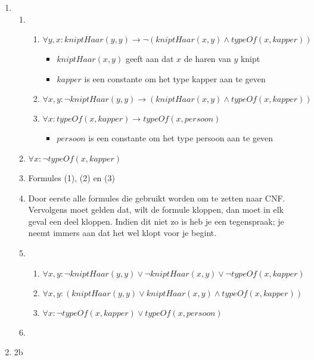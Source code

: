 \documentclass[]{article}
\begin{document}
  \begin{enumerate}[a]
    \item
    \begin{enumerate}[i]
      \item
      \begin{enumerate}[1]
        \item $\forall y, x : kniptHaar(y,y) \longrightarrow \neg (kniptHaar(x,y) \land typeOf(x,kapper)) $
        \begin{itemize}
          \item $kniptHaar(x,y)$ geeft aan dat $x$ de haren van $y$ knipt
          \item $kapper$ is een constante om het type kapper aan te geven
        \end{itemize}
        \item $\forall x,y : \neg kniptHaar(y,y) \longrightarrow (kniptHaar(x,y) \land typeOf(x,kapper)) $
        \item $\forall x: typeOf(x,kapper) \longrightarrow typeOf(x,persoon)$
        \begin{itemize}
          \item $persoon$ is een constante om het type persoon aan te geven
        \end{itemize}
      \end{enumerate}
      \item $\forall x: \neg typeOf(x,kapper)$
      \item Formules (1), (2) en (3)
      \item Door eerste alle formules die gebruikt worden om te zetten naar CNF. Vervolgens moet gelden dat, wilt de formule kloppen, dan moet in elk geval een deel kloppen.
      Indien dit niet zo is heb je een tegenspraak; je neemt immers aan dat het wel klopt voor je begint.
      \item
      \begin{enumerate}[1]
        \item $\forall x,y: \neg kniptHaar(y,y) \lor \neg kniptHaar(x,y) \lor \neg typeOf(x,kapper) $
        \item $\forall x,y: (kniptHaar(y,y) \lor kniptHaar(x,y)\land typeOf(x,kapper))$
        \item $\forall x: \neg typeOf(x,kapper) \lor typeOf(x,persoon) $
      \end{enumerate}
      \item
    \end{enumerate}
    \item 2b

  \end{enumerate}
\end{document}
